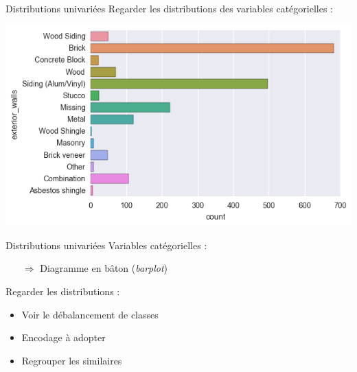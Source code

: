 \documentclass[french]{beamer}
\begin{document}
\begin{frame}{Distributions univariées}
Regarder les distributions des variables catégorielles : 
\begin{center}
	\includegraphics[height=0.8\textheight]{barplot}
\end{center}
\end{frame}

\begin{frame}{Distributions univariées}
Variables catégorielles : 
\begin{itemize}
	\item[$\Rightarrow$] Diagramme en bâton (\emph{barplot})
\end{itemize}

Regarder les distributions : 
\begin{itemize}
	\item Voir le débalancement de classes
	\item Encodage à adopter
	\item Regrouper les similaires
\end{itemize}
\end{frame}
\end{document}
